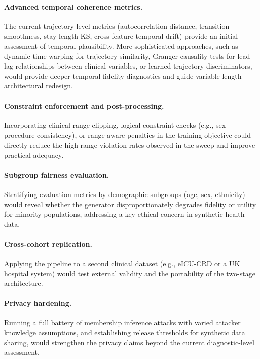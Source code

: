 \paragraph{Advanced temporal coherence metrics.}
The current trajectory-level metrics (autocorrelation distance, transition smoothness, stay-length KS, cross-feature temporal drift) provide an initial assessment of temporal plausibility. More sophisticated approaches, such as dynamic time warping for trajectory similarity, Granger causality tests for lead--lag relationships between clinical variables, or learned trajectory discriminators, would provide deeper temporal-fidelity diagnostics and guide variable-length architectural redesign.

\paragraph{Constraint enforcement and post-processing.}
Incorporating clinical range clipping, logical constraint checks (e.g., sex--procedure consistency), or range-aware penalties in the training objective could directly reduce the high range-violation rates observed in the sweep and improve practical adequacy.

\paragraph{Subgroup fairness evaluation.}
Stratifying evaluation metrics by demographic subgroups (age, sex, ethnicity) would reveal whether the generator disproportionately degrades fidelity or utility for minority populations, addressing a key ethical concern in synthetic health data.

\paragraph{Cross-cohort replication.}
Applying the pipeline to a second clinical dataset (e.g., eICU-CRD or a UK hospital system) would test external validity and the portability of the two-stage architecture.

\paragraph{Privacy hardening.}
Running a full battery of membership inference attacks with varied attacker knowledge assumptions, and establishing release thresholds for synthetic data sharing, would strengthen the privacy claims beyond the current diagnostic-level assessment.

